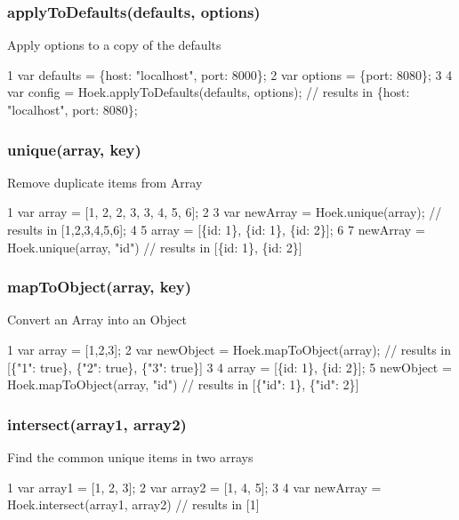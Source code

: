 \subsubsection*{apply\+To\+Defaults(defaults, options)}

Apply options to a copy of the defaults


\begin{DoxyCode}
1 var defaults = \{host: "localhost", port: 8000\};
2 var options = \{port: 8080\};
3 
4 var config = Hoek.applyToDefaults(defaults, options); // results in \{host: "localhost", port: 8080\};
\end{DoxyCode}


\subsubsection*{unique(array, key)}

Remove duplicate items from Array


\begin{DoxyCode}
1 var array = [1, 2, 2, 3, 3, 4, 5, 6];
2 
3 var newArray = Hoek.unique(array); // results in [1,2,3,4,5,6];
4 
5 array = [\{id: 1\}, \{id: 1\}, \{id: 2\}];
6 
7 newArray = Hoek.unique(array, "id") // results in [\{id: 1\}, \{id: 2\}]
\end{DoxyCode}


\subsubsection*{map\+To\+Object(array, key)}

Convert an Array into an Object


\begin{DoxyCode}
1 var array = [1,2,3];
2 var newObject = Hoek.mapToObject(array); // results in [\{"1": true\}, \{"2": true\}, \{"3": true\}]
3 
4 array = [\{id: 1\}, \{id: 2\}];
5 newObject = Hoek.mapToObject(array, "id") // results in [\{"id": 1\}, \{"id": 2\}]
\end{DoxyCode}
 \subsubsection*{intersect(array1, array2)}

Find the common unique items in two arrays


\begin{DoxyCode}
1 var array1 = [1, 2, 3];
2 var array2 = [1, 4, 5];
3 
4 var newArray = Hoek.intersect(array1, array2) // results in [1]
\end{DoxyCode}


